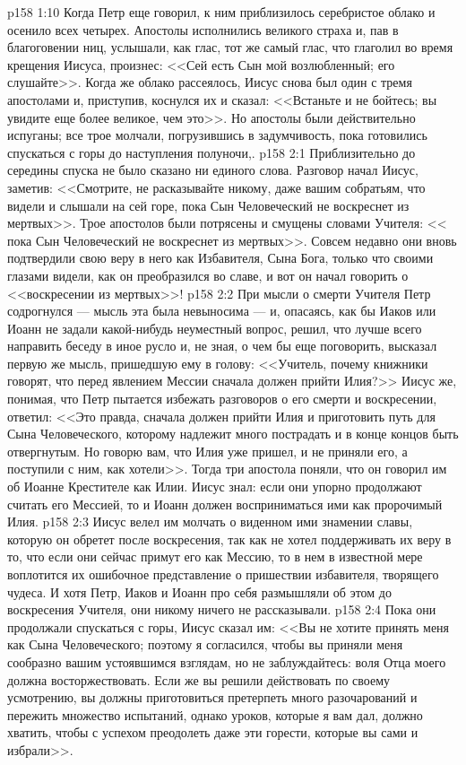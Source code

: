 \vs p158 1:10 Когда Петр еще говорил, к ним приблизилось серебристое облако и осенило всех четырех. Апостолы исполнились великого страха и, пав в благоговении ниц, услышали, как глас, тот же самый глас, что глаголил во время крещения Иисуса, произнес: <<Сей есть Сын мой возлюбленный; его слушайте>>. Когда же облако рассеялось, Иисус снова был один с тремя апостолами и, приступив, коснулся их и сказал: <<Встаньте и не бойтесь; вы увидите еще более великое, чем это>>. Но апостолы были действительно испуганы; все трое молчали, погрузившись в задумчивость, пока готовились спускаться с горы до наступления полуночи,.
\vs p158 2:1 Приблизительно до середины спуска не было сказано ни единого слова. Разговор начал Иисус, заметив: <<Смотрите, не расказывайте никому, даже вашим собратьям, что видели и слышали на сей горе, пока Сын Человеческий не воскреснет из мертвых>>. Трое апостолов были потрясены и смущены словами Учителя: << пока Сын Человеческий не воскреснет из мертвых>>. Совсем недавно они вновь подтвердили свою веру в него как Избавителя, Сына Бога, только что своими глазами видели, как он преобразился во славе, и вот он начал говорить о <<воскресении из мертвых>>!
\vs p158 2:2 При мысли о смерти Учителя Петр содрогнулся --- мысль эта была невыносима --- и, опасаясь, как бы Иаков или Иоанн не задали какой\hyp{}нибудь неуместный вопрос, решил, что лучше всего направить беседу в иное русло и, не зная, о чем бы еще поговорить, высказал первую же мысль, пришедшую ему в голову: <<Учитель, почему книжники говорят, что перед явлением Мессии сначала должен прийти Илия?>> Иисус же, понимая, что Петр пытается избежать разговоров о его смерти и воскресении, ответил: <<Это правда, сначала должен прийти Илия и приготовить путь для Сына Человеческого, которому надлежит много пострадать и в конце концов быть отвергнутым. Но говорю вам, что Илия уже пришел, и не приняли его, а поступили с ним, как хотели>>. Тогда три апостола поняли, что он говорил им об Иоанне Крестителе как Илии. Иисус знал: если они упорно продолжают считать его Мессией, то и Иоанн должен восприниматься ими как пророчимый Илия.
\vs p158 2:3 Иисус велел им молчать о виденном ими знамении славы, которую он обретет после воскресения, так как не хотел поддерживать их веру в то, что если они сейчас примут его как Мессию, то в нем в известной мере воплотится их ошибочное представление о пришествии избавителя, творящего чудеса. И хотя Петр, Иаков и Иоанн про себя размышляли об этом до воскресения Учителя, они никому ничего не рассказывали.
\vs p158 2:4 Пока они продолжали спускаться с горы, Иисус сказал им: <<Вы не хотите принять меня как Сына Человеческого; поэтому я согласился, чтобы вы приняли меня сообразно вашим устоявшимся взглядам, но не заблуждайтесь: воля Отца моего должна восторжествовать. Если же вы решили действовать по своему усмотрению, вы должны приготовиться претерпеть много разочарований и пережить множество испытаний, однако уроков, которые я вам дал, должно хватить, чтобы с успехом преодолеть даже эти горести, которые вы сами и избрали>>.
